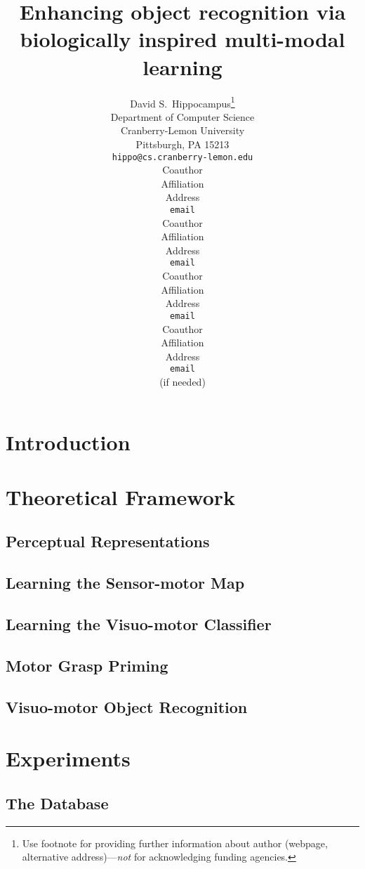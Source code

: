 \documentclass{article}
\title{\title{Enhancing object recognition via\\
biologically inspired multi-modal learning}
}
\author{
David S.~Hippocampus\thanks{ Use footnote for providing further information
about author (webpage, alternative address)---\emph{not} for acknowledging
funding agencies.} \\
Department of Computer Science\\
Cranberry-Lemon University\\
Pittsburgh, PA 15213 \\
\texttt{hippo@cs.cranberry-lemon.edu} \\
\And
Coauthor \\
Affiliation \\
Address \\
\texttt{email} \\
\AND
Coauthor \\
Affiliation \\
Address \\
\texttt{email} \\
\And
Coauthor \\
Affiliation \\
Address \\
\texttt{email} \\
\And
Coauthor \\
Affiliation \\
Address \\
\texttt{email} \\
(if needed)\\
}
\begin{document}
\makeanontitle

\begin{abstract}

\end{abstract}

\section{Introduction}


\label{sec:intro}

\section{Theoretical Framework}
\label{sec::framework}


\subsection{Perceptual Representations}
\label{sec:2.1}


\subsection{Learning the Sensor-motor Map}
\label{sec:2.2}


\subsection{Learning the Visuo-motor Classifier}
\label{sec:2.3}


\subsection{Motor Grasp Priming}
\label{sec:2.4}


\subsection{Visuo-motor Object Recognition}
\label{sec:2.5}


\section{Experiments}
\label{exper}


\subsection{The Database}
\label{sec:3.1}

\end{document}
